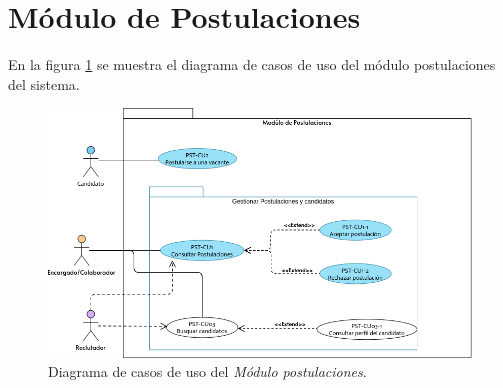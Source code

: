 	
	

	
	

	
	

	
	

	
	
	


	\section{Módulo de Postulaciones}
	En la figura \ref{adcu:usr} se muestra el diagrama de casos de uso del módulo postulaciones del sistema.

	\begin{figure}[hbtp!]
		\begin{center}
			\includegraphics[width=.8\textwidth]{sprints/imagenes/DCUPST.png}
		\end{center}
		
		\caption{Diagrama de casos de uso del \textit{Módulo postulaciones}.}
		\label{adcu:usr}
	\end{figure}

	
	

	
	